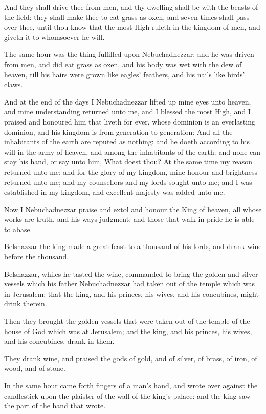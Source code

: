\Verse And they shall drive thee from men, and thy dwelling shall be with the beasts of the field: they shall make thee to eat grass as oxen, and seven times shall pass over thee, until thou know that the most High ruleth in the kingdom of men, and giveth it to whomsoever he will.

\Verse The same hour was the thing fulfilled upon Nebuchadnezzar: and he was driven from men, and did eat grass as oxen, and his body was wet with the dew of heaven, till his hairs were grown like eagles' feathers, and his nails like birds' claws.

\Verse And at the end of the days I Nebuchadnezzar lifted up mine eyes unto heaven, and mine understanding returned unto me, and I blessed the most High, and I praised and honoured him that liveth for ever, whose dominion is an everlasting dominion, and his kingdom is from generation to generation: \Verse And all the inhabitants of the earth are reputed as nothing: and he doeth according to his will in the army of heaven, and among the inhabitants of the earth: and none can stay his hand, or say unto him, What doest thou?  \Verse At the same time my reason returned unto me; and for the glory of my kingdom, mine honour and brightness returned unto me; and my counsellors and my lords sought unto me; and I was established in my kingdom, and excellent majesty was added unto me.

\Verse Now I Nebuchadnezzar praise and extol and honour the King of heaven, all whose works are truth, and his ways judgment: and those that walk in pride he is able to abase.


\Chapter
\Verse Belshazzar the king made a great feast to a thousand of his lords, and drank wine before the thousand.

\Verse Belshazzar, whiles he tasted the wine, commanded to bring the golden and silver vessels which his father Nebuchadnezzar had taken out of the temple which was in Jerusalem; that the king, and his princes, his wives, and his concubines, might drink therein.

\Verse Then they brought the golden vessels that were taken out of the temple of the house of God which was at Jerusalem; and the king, and his princes, his wives, and his concubines, drank in them.

\Verse They drank wine, and praised the gods of gold, and of silver, of brass, of iron, of wood, and of stone.

\Verse In the same hour came forth fingers of a man's hand, and wrote over against the candlestick upon the plaister of the wall of the king's palace: and the king saw the part of the hand that wrote.

